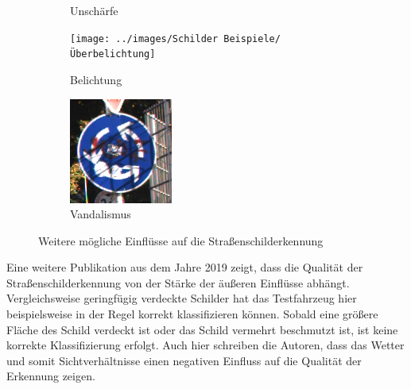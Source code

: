 \begin{figure}[H]
\begin{subfigure}[b]{0.125\textwidth}
       \caption{Unschärfe}
       \label{fig:motion-blur}
   \end{subfigure}
   \hspace{3em}%
   \begin{subfigure}[b]{0.125\textwidth}
       \centering
       \texttt{[image: ../images/Schilder Beispiele/Überbelichtung]}
       \caption{Belichtung}
       \label{fig:ueberbelichtung}
   \end{subfigure}
   \hspace{3em}%
   \begin{subfigure}[b]{0.125\textwidth}
    \centering
    \includegraphics[height=\textwidth]{../images/Schilder Beispiele/Vandalismus.png}
    \caption{Vandalismus}
    \label{fig:vandalism}
   \end{subfigure}
      \caption{Weitere mögliche Einflüsse auf die Straßenschilderkennung \cite{GTSRB} \cite{schnee-schild}}
      \label{fig:einfluesse-strscherkennung2}
\end{figure}

Eine weitere Publikation aus dem Jahre 2019 zeigt, dass die Qualität der Straßenschilderkennung von der Stärke der äußeren Einflüsse abhängt. Vergleichsweise geringfügig verdeckte Schilder hat das Testfahrzeug hier beispielsweise in der Regel korrekt klassifizieren können. Sobald eine größere Fläche des Schild verdeckt ist oder das Schild vermehrt beschmutzt ist, ist keine korrekte Klassifizierung erfolgt. Auch hier schreiben die Autoren, dass das Wetter und somit Sichtverhältnisse einen negativen Einfluss auf die Qualität der Erkennung zeigen. \cite{traffic-sign-anomalies}

